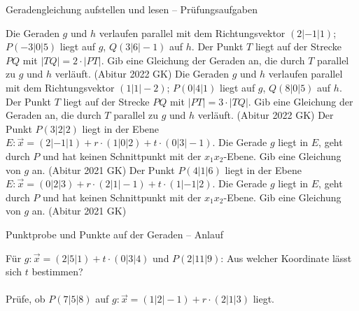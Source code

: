 \begin{aufgabe}{Geradengleichung aufstellen und lesen – Prüfungsaufgaben}
\begin{teile}
\teil Die Geraden $g$ und $h$ verlaufen parallel mit dem Richtungsvektor $(2 | -1 | 1)$; $P(-3 | 0 | 5)$ liegt auf $g$, $Q(3 | 6 | -1)$ auf $h$. Der Punkt $T$ liegt auf der Strecke $PQ$ mit $|TQ| = 2 \cdot |PT|$. Gib eine Gleichung der Geraden an, die durch $T$ parallel zu $g$ und $h$ verläuft. \hfill (Abitur 2022 GK)
\teil Die Geraden $g$ und $h$ verlaufen parallel mit dem Richtungsvektor $(1 | 1 | -2)$; $P(0 | 4 | 1)$ liegt auf $g$, $Q(8 | 0 | 5)$ auf $h$. Der Punkt $T$ liegt auf der Strecke $PQ$ mit $|PT| = 3 \cdot |TQ|$. Gib eine Gleichung der Geraden an, die durch $T$ parallel zu $g$ und $h$ verläuft. \hfill (Abitur 2022 GK)
\teil Der Punkt $P(3 | 2 | 2)$ liegt in der Ebene $E\colon \vec x = (2 | -1 | 1) + r \cdot (1 | 0 | 2) + t \cdot (0 | 3 | -1)$. Die Gerade $g$ liegt in $E$, geht durch $P$ und hat keinen Schnittpunkt mit der $x_1x_2$-Ebene. Gib eine Gleichung von $g$ an. \hfill (Abitur 2021 GK)
\teil Der Punkt $P(4 | 1 | 6)$ liegt in der Ebene $E\colon \vec x = (0 | 2 | 3) + r \cdot (2 | 1 | -1) + t \cdot (1 | -1 | 2)$. Die Gerade $g$ liegt in $E$, geht durch $P$ und hat keinen Schnittpunkt mit der $x_1x_2$-Ebene. Gib eine Gleichung von $g$ an. \hfill (Abitur 2021 GK)
\end{teile}
\end{aufgabe}

\begin{aufgabe}{Punktprobe und Punkte auf der Geraden – Anlauf}
\begin{teile}
\teil Für $g\colon \vec x = (2 | 5 | 1) + t \cdot (0 | 3 | 4)$ und $P(2 | 11 | 9)$: Aus welcher Koordinate lässt sich $t$ bestimmen?  \\  \\ 
\teil Prüfe, ob $P(7 | 5 | 8)$ auf $g\colon \vec x = (1 | 2 | -1) + r \cdot (2 | 1 | 3)$ liegt.
\end{teile}
\end{aufgabe}

